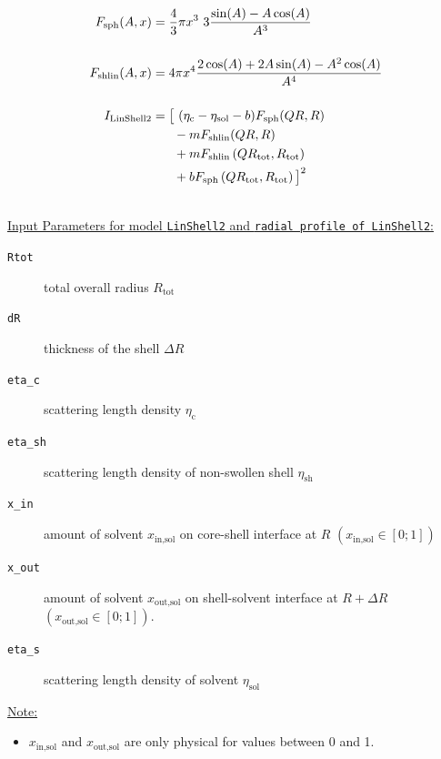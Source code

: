 \begin{align}
F_\text{sph}(A,x) & = \frac{4}{3}\pi x^3 \,\, 3\frac{\sin(A)-A\cos(A)}{A^3} \\[5mm]
F_\text{shlin}(A,x) & = 4\pi x^4 \frac{2\cos(A)+2A\sin(A)-A^2\cos(A)}{A^4} \\[5mm]
I_\text{LinShell2}    & = \big[ \,\, (\eta_\text{c}-\eta_\text{sol}-b)F_\text{sph}(QR,R) \nonumber \\
             & \hspace{6mm} - mF_\text{shlin}(QR,R) \\
             & \hspace{6mm} + mF_\text{shlin}\left(QR_\text{tot},R_\text{tot}\right) \nonumber \\
             & \hspace{6mm} + bF_\text{sph}\left(QR_\text{tot},R_\text{tot}\right) \big]^2 \nonumber
\end{align}

\vspace{5mm}

\hspace{1pt}\\
\underline{Input Parameters for model \texttt{LinShell2} and \texttt{radial profile of LinShell2}:}\\
\begin{description}
\item[\texttt{Rtot}] total overall radius $R_\text{tot}$
\item[\texttt{dR}] thickness of the shell $\Delta R$
\item[\texttt{eta\_c}] scattering length density $\eta_\text{c}$
\item[\texttt{eta\_sh}] scattering length density of non-swollen shell $\eta_\text{sh}$
\item[\texttt{x\_in}] amount of solvent $x_\text{in,sol}$ on core-shell interface at $R$ $(x_\text{in,sol} \in [0;1])$
\item[\texttt{x\_out}] amount of solvent $x_\text{out,sol}$ on shell-solvent interface at $R+\Delta R$ $(x_\text{out,sol} \in [0;1])$.
\item[\texttt{eta\_s}] scattering length density of solvent $\eta_\text{sol}$
\end{description}


\noindent\underline{Note:}
\begin{itemize}
\item $x_\text{in,sol}$ and $x_\text{out,sol}$ are only physical for values between 0 and 1.
\end{itemize}

